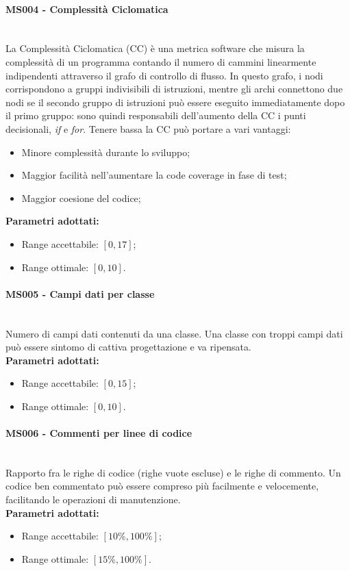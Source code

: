 \paragraph{MS004 - Complessità Ciclomatica}\mbox{}\\[0,3cm]
La Complessità Ciclomatica (CC) è una metrica software che misura la complessità di un programma contando il numero di cammini linearmente indipendenti attraverso il grafo di controllo di flusso. In questo grafo, i nodi corrispondono a gruppi indivisibili di istruzioni, mentre gli archi connettono due nodi se il secondo gruppo di istruzioni può essere eseguito immediatamente dopo il primo gruppo: sono quindi responsabili dell'aumento della CC i punti decisionali, \emph{if} e \emph{for}.
Tenere bassa la CC può portare a vari vantaggi:
\begin{itemize}
	\item Minore complessità durante lo sviluppo;
	\item Maggior facilità nell'aumentare la code coverage in fase di test;
	\item Maggior coesione del codice;
\end{itemize}
\textbf{Parametri adottati:}
\begin{itemize}
	\item Range accettabile: $[0,17]$;
	\item Range ottimale: $[0,10]$.
\end{itemize}

\paragraph{MS005 - Campi dati per classe}\mbox{}\\[0,3cm]
Numero di campi dati contenuti da una classe. Una classe con troppi campi dati può essere sintomo di cattiva progettazione e va ripensata.\\[0,2cm]
\textbf{Parametri adottati:}
\begin{itemize}
	\item Range accettabile: $[0,15]$;
	\item Range ottimale: $[0,10]$.
\end{itemize}

\paragraph{MS006 - Commenti per linee di codice}\mbox{}\\[0,3cm]
Rapporto fra le righe di codice (righe vuote escluse) e le righe di commento. Un codice ben commentato può essere compreso più facilmente e velocemente, facilitando le operazioni di manutenzione.\\[0,2cm]
\textbf{Parametri adottati:}
\begin{itemize}
	\item Range accettabile: $[10\%,100\%]$;
	\item Range ottimale: $[15\%,100\%]$.
\end{itemize}

